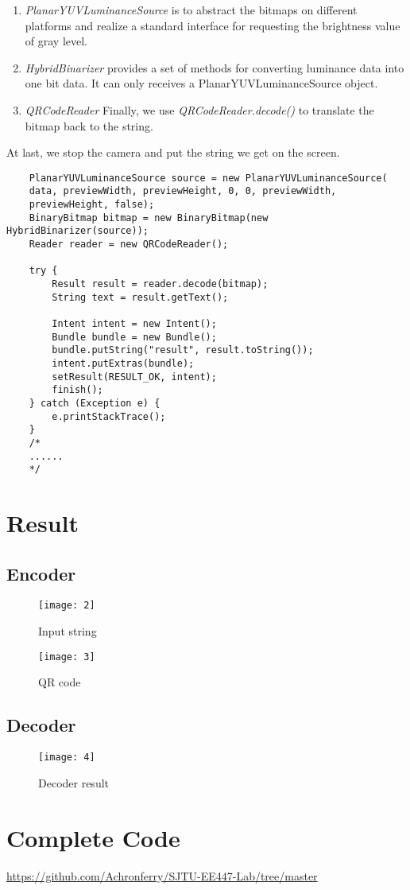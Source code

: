 \documentclass[12pt]{report}
\begin{document}
\begin{enumerate}
	\item \textit{PlanarYUVLuminanceSource} is to abstract the bitmaps on different platforms and realize a standard interface for requesting the brightness value of gray level. 
	\item \textit{HybridBinarizer} provides a set of methods for converting luminance data into one bit data. It can only receives a PlanarYUVLuminanceSource object.
	\item \textit{QRCodeReader} Finally, we use \textit{QRCodeReader.decode()} to translate the bitmap back to the string.   
\end{enumerate}

At last, we stop the camera and put the string we get on the screen.
\begin{lstlisting}
	PlanarYUVLuminanceSource source = new PlanarYUVLuminanceSource(
	data, previewWidth, previewHeight, 0, 0, previewWidth,
	previewHeight, false);
	BinaryBitmap bitmap = new BinaryBitmap(new HybridBinarizer(source));
	Reader reader = new QRCodeReader();

	try {
		Result result = reader.decode(bitmap);
		String text = result.getText();
		
		Intent intent = new Intent();
		Bundle bundle = new Bundle();
		bundle.putString("result", result.toString());
		intent.putExtras(bundle);
		setResult(RESULT_OK, intent);
		finish();
	} catch (Exception e) {
		e.printStackTrace();
	}
	/*
	......
	*/
\end{lstlisting}
\newpage
\section{Result}
\subsection{Encoder}
\begin{figure*}[!htbp]
	\begin{minipage}{0.5\textwidth} 
	\centering
	\texttt{[image: 2]}
	\caption{Input string}
	\label{fig:2}
	\end{minipage}
	\hfill
	\begin{minipage}{0.5\textwidth} 
	\centering
	\texttt{[image: 3]}
	\caption{QR code}
	\label{fig:3}
	\end{minipage}
\end{figure*}

\newpage
\subsection{Decoder}
\begin{figure}[!htbp]
	\centering
	\texttt{[image: 4]}
	\caption{Decoder result}
	\label{fig:4}
\end{figure}

\section{Complete Code}
\noindent\url{https://github.com/Achronferry/SJTU-EE447-Lab/tree/master}
\end{document}
